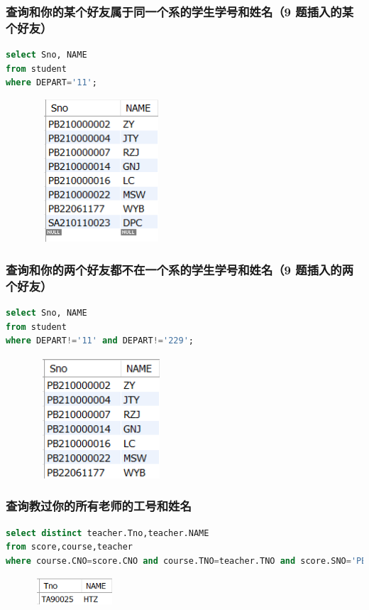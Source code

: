 \documentclass{ctexart}
\begin{document}
\subsubsection{查询和你的某个好友属于同一个系的学生学号和姓名（9 题插入的某个好友）}
\begin{lstlisting}[language=sql]
select Sno, NAME
from student
where DEPART='11';
\end{lstlisting}
\begin{figure}[H]
	\centering 
	\includegraphics[height=5.3cm,width=5cm]{15.png}
	\end{figure}
\subsubsection{查询和你的两个好友都不在一个系的学生学号和姓名（9 题插入的两个好友）}
\begin{lstlisting}[language=sql]
select Sno, NAME
from student
where DEPART!='11' and DEPART!='229';
\end{lstlisting}
\begin{figure}[H]
	\centering 
	\includegraphics[height=4.5cm,width=5cm]{25.png}
	\end{figure}
\subsubsection{查询教过你的所有老师的工号和姓名}
\begin{lstlisting}[language=sql]
select distinct teacher.Tno,teacher.NAME
from score,course,teacher
where course.CNO=score.CNO and course.TNO=teacher.TNO and score.SNO='PB22061161';
\end{lstlisting}
\begin{figure}[H]
	\centering 
	\includegraphics[height=1cm,width=3cm]{26.png}
	\end{figure}
\end{document}
